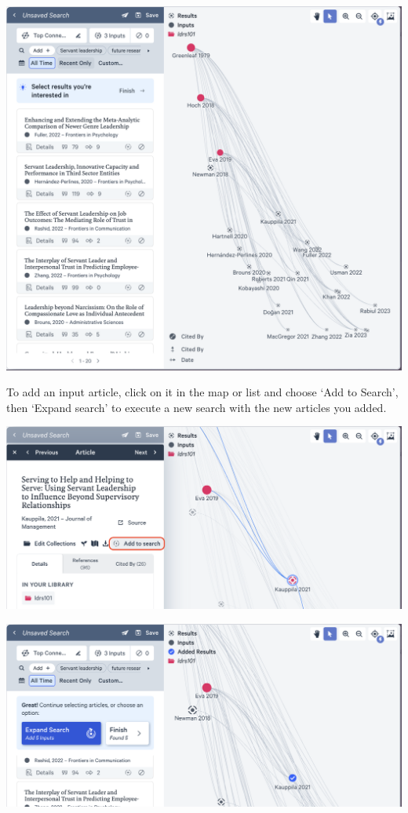 \documentclass[
]{book}
\theoremstyle{definition}
\theoremstyle{definition}
\theoremstyle{definition}
\theoremstyle{definition}
\theoremstyle{remark}
\begin{document}
\includegraphics{assets/u2/litmaps9.png}

To add an input article, click on it in the map or list and choose `Add to Search', then `Expand search' to execute a new search with the new articles you added.

\includegraphics{assets/u2/litmaps10.png}

\includegraphics{assets/u2/litmaps11.png}
\end{document}
